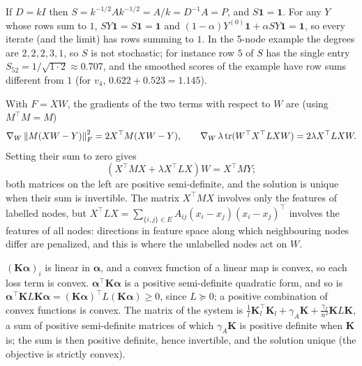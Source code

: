 If $D = kI$ then $S = k^{-1/2}Ak^{-1/2} = A/k = D^{-1}A = P$, and $S\mathbf 1 = \mathbf 1$. For any $Y$ whose rows sum to $1$, $SY\mathbf 1 = S\mathbf 1 = \mathbf 1$ and $(1-\alpha)Y^{(0)}\mathbf 1 + \alpha SY\mathbf 1 = \mathbf 1$, so every iterate (and the limit) has rows summing to $1$. In the 5-node example the degrees are $2, 2, 2, 3, 1$, so $S$ is not stochastic; for instance row $5$ of $S$ has the single entry $S_{52} = 1/\sqrt{1\cdot2} \approx 0.707$, and the smoothed scores of the example have row sums different from $1$ (for $v_4$, $0.622 + 0.523 = 1.145$).

With $F = XW$, the gradients of the two terms with respect to $W$ are (using $M^\top M = M$)
\[
\nabla_W\left\|M(XW - Y)\right\|_F^2 = 2X^\top M(XW - Y), \qquad \nabla_W\,\lambda\operatorname{tr}(W^\top X^\top LXW) = 2\lambda X^\top LXW .
\]
Setting their sum to zero gives
\[
(X^\top MX + \lambda X^\top LX)W = X^\top MY;
\] both matrices on the left are positive semi-definite, and the solution is unique when their sum is invertible. The matrix $X^\top MX$ involves only the features of labelled nodes, but $X^\top LX = \sum_{\{i,j\}\in E}A_{ij}(x_i - x_j)(x_i - x_j)^\top$ involves the features of all nodes: directions in feature space along which neighbouring nodes differ are penalized, and this is where the unlabelled nodes act on $W$.

$(\mathbf K\boldsymbol\alpha)_i$ is linear in $\boldsymbol\alpha$, and a convex function of a linear map is convex, so each loss term is convex. $\boldsymbol\alpha^\top\mathbf K\boldsymbol\alpha$ is a positive semi-definite quadratic form, and so is $\boldsymbol\alpha^\top\mathbf KL\mathbf K\boldsymbol\alpha = (\mathbf K\boldsymbol\alpha)^\top L(\mathbf K\boldsymbol\alpha) \ge 0$, since $L \succeq 0$; a positive combination of convex functions is convex. The matrix of the system is $\frac1l\mathbf K_l^\top\mathbf K_l + \gamma_A\mathbf K + \frac{\gamma_I}{n^2}\mathbf KL\mathbf K$, a sum of positive semi-definite matrices of which $\gamma_A\mathbf K$ is positive definite when $\mathbf K$ is; the sum is then positive definite, hence invertible, and the solution unique (the objective is strictly convex).

\section{}

